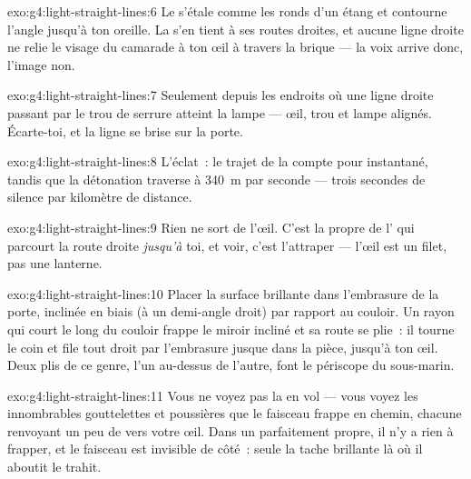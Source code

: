 \begin{solution}{exo:g4:light-straight-lines:6}
Le  s'étale comme les ronds d'un étang et contourne l'angle
jusqu'à ton oreille. La  s'en tient à ses routes droites, et
aucune ligne droite ne relie le visage du camarade à ton œil à
travers la brique --- la voix arrive donc, l'image non.
\end{solution}

\begin{solution}{exo:g4:light-straight-lines:7}
Seulement depuis les endroits où une ligne droite passant par le trou
de serrure atteint la lampe --- œil, trou et lampe alignés.
Écarte-toi, et la ligne se brise sur la porte.
\end{solution}

\begin{solution}{exo:g4:light-straight-lines:8}
L'éclat~: le trajet de la  compte pour instantané, tandis que
la détonation traverse à \qty{340}{m} par seconde --- trois secondes
de silence par kilomètre de distance.
\end{solution}

\begin{solution}{exo:g4:light-straight-lines:9}
Rien ne sort de l'œil. C'est la  propre de l' qui
parcourt la route droite \emph{jusqu'à} toi, et voir, c'est
l'attraper --- l'œil est un filet, pas une lanterne.
\end{solution}

\begin{solution}{exo:g4:light-straight-lines:10}
Placer la surface brillante dans l'embrasure de la porte, inclinée en
biais (à un demi-angle droit) par rapport au couloir. Un rayon qui
court le long du couloir frappe le miroir incliné et sa route se
plie~: il tourne le coin et file tout droit par l'embrasure jusque
dans la pièce, jusqu'à ton œil. Deux plis de ce genre, l'un au-dessus
de l'autre, font le périscope du sous-marin.
\end{solution}

\begin{solution}{exo:g4:light-straight-lines:11}
Vous ne voyez pas la  en vol --- vous voyez les innombrables
gouttelettes et poussières que le faisceau frappe en chemin, chacune
renvoyant un peu de  vers votre œil. Dans un  parfaitement
propre, il n'y a rien à frapper, et le faisceau est invisible de
côté~: seule la tache brillante là où il aboutit le trahit.
\end{solution}
